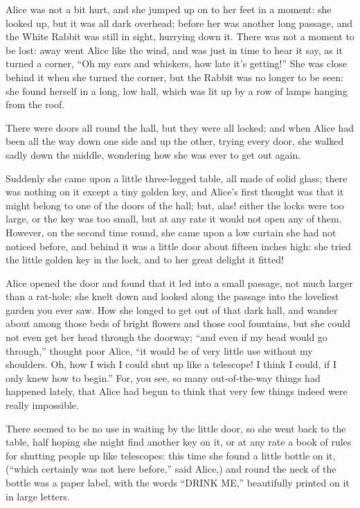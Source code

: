 \documentclass[10pt]{article}
\begin{document}
Alice was not a bit hurt, and she jumped up on to her feet in a moment: she looked up, but it was all dark overhead; before her was another long passage, and the White Rabbit was still in sight, hurrying down it. There was not a moment to be lost: away went Alice like the wind, and was just in time to hear it say, as it turned a corner, ``Oh my ears and whiskers, how late it's getting!'' She was close behind it when she turned the corner, but the Rabbit was no longer to be seen: she found herself in a long, low hall, which was lit up by a row of lamps hanging from the roof.

There were doors all round the hall, but they were all locked; and when Alice had been all the way down one side and up the other, trying every door, she walked sadly down the middle, wondering how she was ever to get out again.

Suddenly she came upon a little three-legged table, all made of solid glass; there was nothing on it except a tiny golden key, and Alice's first thought was that it might belong to one of the doors of the hall; but, alas! either the locks were too large, or the key was too small, but at any rate it would not open any of them. However, on the second time round, she came upon a low curtain she had not noticed before, and behind it was a little door about fifteen inches high: she tried the little golden key in the lock, and to her great delight it fitted!

Alice opened the door and found that it led into a small passage, not much larger than a rat-hole: she knelt down and looked along the passage into the loveliest garden you ever saw. How she longed to get out of that dark hall, and wander about among those beds of bright flowers and those cool fountains, but she could not even get her head through the doorway; ``and even if my head would go through,'' thought poor Alice, ``it would be of very little use without my shoulders. Oh, how I wish I could shut up like a telescope! I think I could, if I only knew how to begin.'' For, you see, so many out-of-the-way things had happened lately, that Alice had begun to think that very few things indeed were really impossible.

There seemed to be no use in waiting by the little door, so she went back to the table, half hoping she might find another key on it, or at any rate a book of rules for shutting people up like telescopes: this time she found a little bottle on it, (``which certainly was not here before,'' said Alice,) and round the neck of the bottle was a paper label, with the words ``DRINK ME,'' beautifully printed on it in large letters.
\end{document}
